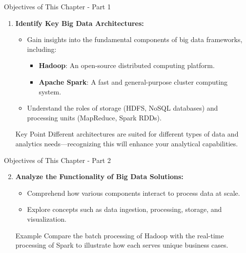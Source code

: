 \documentclass[aspectratio=169]{beamer}
\begin{document}
\begin{frame}[fragile]{Objectives of This Chapter - Part 1}
    \begin{enumerate}
        \item \textbf{Identify Key Big Data Architectures:}
            \begin{itemize}
                \item Gain insights into the fundamental components of big data frameworks, including:
                \begin{itemize}
                    \item \textbf{Hadoop}: An open-source distributed computing platform.
                    \item \textbf{Apache Spark}: A fast and general-purpose cluster computing system.
                \end{itemize}
                \item Understand the roles of storage (HDFS, NoSQL databases) and processing units (MapReduce, Spark RDDs).
            \end{itemize}
            \begin{block}{Key Point}
                Different architectures are suited for different types of data and analytics needs—recognizing this will enhance your analytical capabilities.
            \end{block}
    \end{enumerate}
\end{frame}

\begin{frame}[fragile]{Objectives of This Chapter - Part 2}
    \begin{enumerate}
        \setcounter{enumi}{1} %
        \item \textbf{Analyze the Functionality of Big Data Solutions:}
            \begin{itemize}
                \item Comprehend how various components interact to process data at scale.
                \item Explore concepts such as data ingestion, processing, storage, and visualization.
            \end{itemize}
            \begin{block}{Example}
                Compare the batch processing of Hadoop with the real-time processing of Spark to illustrate how each serves unique business cases.
            \end{block}
    \end{enumerate}
\end{frame}
\end{document}
